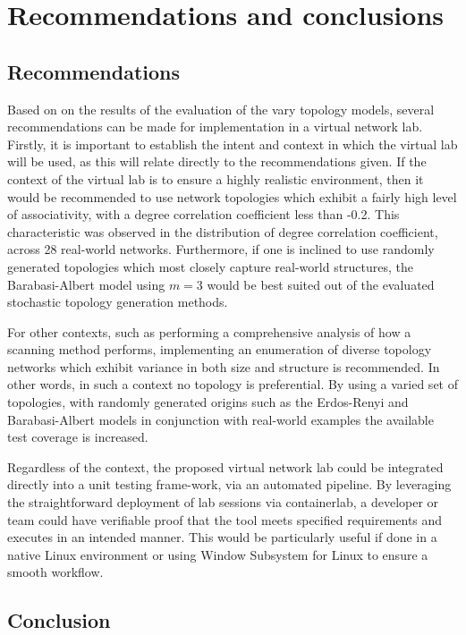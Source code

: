 \section{Recommendations and conclusions}

\subsection{Recommendations}
Based on on the results of the evaluation of the vary topology models, several recommendations can be made for implementation in a virtual network lab. Firstly, it is important to establish the intent and context in which the virtual lab will be used, as this will relate directly to the recommendations given. If the context of the virtual lab is to ensure a highly realistic environment, then it would be recommended to use network topologies which exhibit a fairly high level of associativity, with a degree correlation coefficient less than -0.2. This characteristic was observed in the distribution of degree correlation coefficient, across 28 real-world networks. Furthermore, if one is inclined to use randomly generated topologies which most closely capture real-world structures, the Barabasi-Albert model using $m=3$ would be best suited out of the evaluated stochastic topology generation methods.

For other contexts, such as performing a comprehensive analysis of how a scanning method performs, implementing an enumeration of diverse topology networks which exhibit variance in both size and structure is recommended. In other words, in such a context no topology is preferential. By using a varied set of topologies, with randomly generated origins such as the Erdos-Renyi and Barabasi-Albert models in conjunction with real-world examples the available test coverage is increased. 

Regardless of the context, the proposed virtual network lab could be integrated directly into a unit testing frame-work, via an automated pipeline. By leveraging the straightforward deployment of lab sessions via containerlab, a developer or team could have verifiable proof that the tool meets specified requirements and executes in an intended manner. This would be particularly useful if done in a native Linux environment or using Window Subsystem for Linux\cite{wsl} to ensure a smooth workflow.

\subsection{Conclusion}



